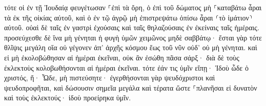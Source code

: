 \documentclass{openreader}
\begin{document}
τότε οἱ ἐν τῇ Ἰουδαίᾳ φευγέτωσαν ⸀ἐπὶ τὰ ὄρη, 
ὁ ἐπὶ τοῦ δώματος μὴ ⸀καταβάτω ἆραι τὰ ἐκ τῆς οἰκίας αὐτοῦ, 
καὶ ὁ ἐν τῷ ἀγρῷ μὴ ἐπιστρεψάτω ὀπίσω ἆραι ⸂τὸ ἱμάτιον⸃ αὐτοῦ. 
οὐαὶ δὲ ταῖς ἐν γαστρὶ ἐχούσαις καὶ ταῖς θηλαζούσαις ἐν ἐκείναις ταῖς ἡμέραις. 
προσεύχεσθε δὲ ἵνα μὴ γένηται ἡ φυγὴ ὑμῶν χειμῶνος μηδὲ σαββάτῳ· 
ἔσται γὰρ τότε θλῖψις μεγάλη οἵα οὐ γέγονεν ἀπ’ ἀρχῆς κόσμου ἕως τοῦ νῦν οὐδ’ οὐ μὴ γένηται. 
καὶ εἰ μὴ ἐκολοβώθησαν αἱ ἡμέραι ἐκεῖναι, οὐκ ἂν ἐσώθη πᾶσα σάρξ· διὰ δὲ τοὺς ἐκλεκτοὺς κολοβωθήσονται αἱ ἡμέραι ἐκεῖναι. 
τότε ἐάν τις ὑμῖν εἴπῃ· Ἰδοὺ ὧδε ὁ χριστός, ἤ· Ὧδε, μὴ πιστεύσητε· 
ἐγερθήσονται γὰρ ψευδόχριστοι καὶ ψευδοπροφῆται, καὶ δώσουσιν σημεῖα μεγάλα καὶ τέρατα ὥστε ⸀πλανῆσαι εἰ δυνατὸν καὶ τοὺς ἐκλεκτούς· 
ἰδοὺ προείρηκα ὑμῖν. 
\end{document}
